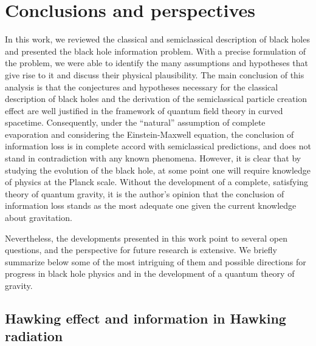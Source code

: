 \documentclass[
12pt,		%
openright,	%
twoside,  %
a4paper,			%
chapter=TITLE,		%
english,			%
french,				%
spanish,			%
brazil				%
]{USPSC-classe/USPSC}
\begin{document}
\chapter{Conclusions and perspectives}\label{conclusion} 

In this work, we reviewed the classical and semiclassical description of black holes and presented the black hole information problem. With a precise formulation of the problem, we were able to identify the many assumptions and hypotheses that give rise to it and discuss their physical plausibility. The main conclusion of this analysis is that the conjectures and hypotheses necessary for the classical description of black holes and the derivation of the semiclassical particle creation effect are well justified in the framework of quantum field theory in curved spacetime. Consequently, under the ``natural'' assumption of complete evaporation and considering the Einstein-Maxwell equation, the conclusion of information loss is in complete accord with semiclassical predictions, and does not stand in contradiction with any known phenomena. However, it is clear that by studying the evolution of the black hole, at some point one will require knowledge of physics at the Planck scale. Without the development of a complete, satisfying theory of quantum gravity, it is the author's opinion that the conclusion of information loss stands as the most adequate one given the current knowledge about gravitation.

Nevertheless, the developments presented in this work point to several open questions, and the perspective for future research is extensive. We briefly summarize below some of the most intriguing of them and possible directions for progress in black hole physics and in the development of a quantum theory of gravity.

\section{Hawking effect and information in Hawking radiation}
\end{document}
